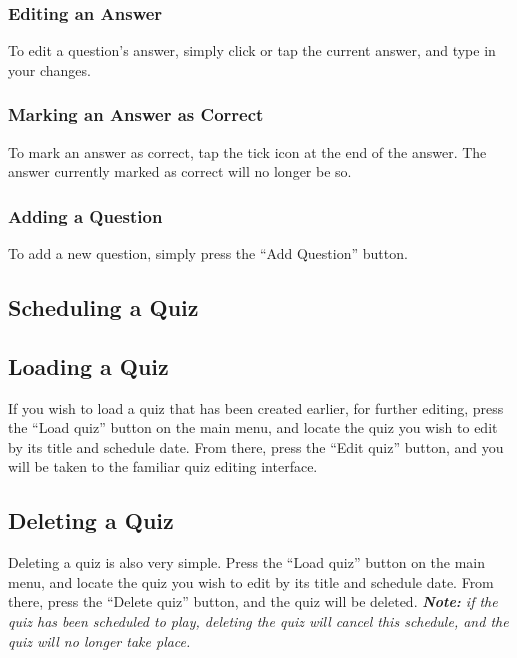 \subsubsection{Editing an Answer} %
\label{ssub:editing_an_answer}
To edit a question's answer, simply click or tap the current answer, and type in your changes.

\subsubsection{Marking an Answer as Correct} %
\label{ssub:marking_an_answer_as_correct}
To mark an answer as correct, tap the tick icon at the end of the answer. The answer currently marked as correct will no longer be so.

\subsubsection{Adding a Question} %
\label{ssub:adding_a_question}
To add a new question, simply press the ``Add Question'' button.


\subsection{Scheduling a Quiz} %
\label{sub:scheduling_a_quiz}


\subsection{Loading a Quiz} %
\label{sub:loading_a_quiz}
If you wish to load a quiz that has been created earlier, for further editing, press the ``Load quiz'' button on the main menu, and locate the quiz you wish to edit by its title and schedule date. From there, press the ``Edit quiz'' button, and you will be taken to the familiar quiz editing interface.

\subsection{Deleting a Quiz} %
\label{sub:deleting_a_quiz}
Deleting a quiz is also very simple. Press the ``Load quiz'' button on the main menu, and locate the quiz you wish to edit by its title and schedule date. From there, press the ``Delete quiz'' button, and the quiz will be deleted. \textit{\textbf{Note:} if the quiz has been scheduled to play, deleting the quiz will cancel this schedule, and the quiz will no longer take place.}
